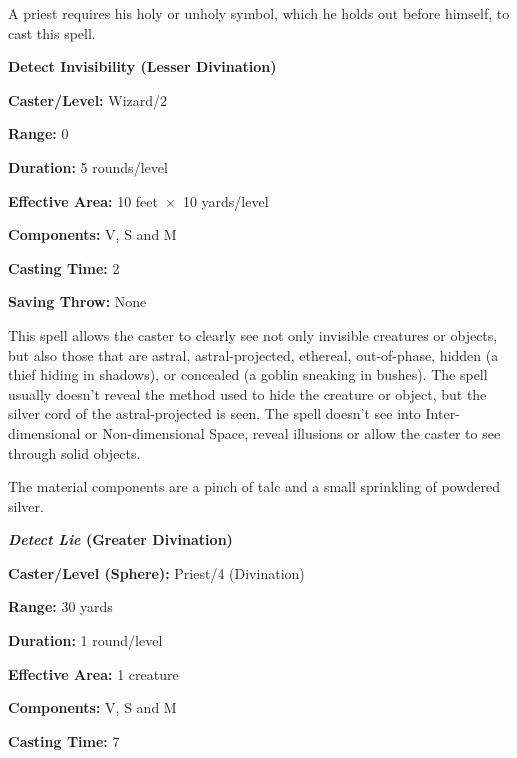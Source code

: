 \begin{multicols}{2}
A priest requires his holy or unholy symbol, which he holds out before himself, to cast this spell.  
 
\vspace{1em}

\noindent
\begin{minipage}{\columnwidth}

\noindent \textbf{Detect Invisibility (Lesser Divination)}

\noindent \textbf{Caster/Level:} Wizard/2

\noindent \textbf{Range:} 0

\noindent \textbf{Duration:} 5 rounds/level

\noindent \textbf{Effective Area:} 10 feet~$\times$~10 yards/level

\noindent \textbf{Components:} V, S and M

\noindent \textbf{Casting Time:} 2

\noindent \textbf{Saving Throw:} None

\end{minipage}

This spell allows the caster to clearly see not only invisible creatures or objects, but also those that are astral, astral-projected, ethereal, out-of-phase, hidden (a thief hiding in shadows), or concealed (a goblin sneaking in bushes).  The spell usually doesn't reveal the method used to hide the creature or object, but the silver cord of the astral-projected is seen.  The spell doesn't see into Inter-dimensional or Non-dimensional Space, reveal illusions or allow the caster to see through solid objects.  

The material components are a pinch of talc and a small sprinkling of powdered silver.

\vspace{1em}

\noindent
\begin{minipage}{\columnwidth}

\noindent \textbf{\textit{Detect Lie} (Greater Divination)}

\noindent \textbf{Caster/Level (Sphere):} Priest/4 (Divination)

\noindent \textbf{Range:} 30 yards

\noindent \textbf{Duration:} 1 round/level

\noindent \textbf{Effective Area:} 1 creature

\noindent \textbf{Components:} V, S and M

\noindent \textbf{Casting Time:} 7


\end{minipage}
\end{multicols}
